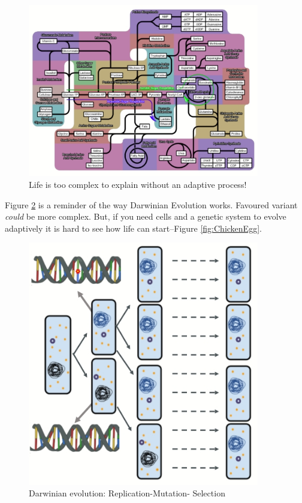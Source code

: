 \documentclass[]{article}
\begin{document}
\begin{figure}[H]
	\caption{Life is too complex to explain without an adaptive
		process!}\label{fig:LifeTooComplex}
	\includegraphics[width=0.9\textwidth]{LifeTooComplex}
\end{figure}

Figure \ref{fig:ReplicationMutationSelection} is a reminder of the way Darwinian Evolution works. Favoured variant \textit{could} be more complex. But, if you need cells and a genetic system to evolve adaptively it is hard to see how life can start--Figure \ref{fig:ChickenEgg}.
\begin{figure}[H]
	\caption{Darwinian evolution: Replication-Mutation- Selection}\label{fig:ReplicationMutationSelection}
	\includegraphics[width=0.9\textwidth]{ReplicationMutationSelection}
\end{figure}
\end{document}
